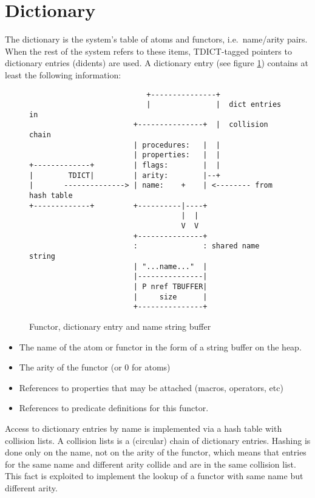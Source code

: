 \section{Dictionary}
\label{chapdictionary}
The dictionary  is the system's table of atoms  and functors, i.e.\
name/arity  pairs.  When the rest of the system refers to these items,
TDICT\index{TDICT}-tagged pointers to dictionary entries (didents\index{didents}) are used.
A dictionary entry (see figure \ref{figdictentry})
contains at least the following information:
\begin{figure}
\hfill
\begin{minipage}[t]{.9\textwidth}
\begin{tiny}
\begin{verbatim}
                           +---------------+
                           |               |  dict entries in
                        +---------------+  |  collision chain
                        | procedures:   |  |
                        | properties:   |  |
+-------------+         | flags:        |  |
|        TDICT|         | arity:        |--+
|       --------------> | name:    +    | <-------- from hash table
+-------------+         +----------|----+
                                   |  |
                                   V  V
                        +---------------+
                        :               : shared name string
                        | "...name..."  |
                        |---------------|
                        | P nref TBUFFER|
                        |     size      |
                        +---------------+
\end{verbatim}
\end{tiny}
\end{minipage}
\hfill
\caption{Functor, dictionary entry and name string buffer}
\label{figdictentry}
\end{figure}
\begin{itemize}
\item The name of the atom or functor in the form of a string buffer on the heap.
\item The arity of the functor (or 0 for atoms)
\item References to properties that may be attached (macros, operators, etc)
\item References to predicate definitions for this functor.
\end{itemize}
Access to dictionary entries by name is implemented via a hash table
with collision lists.  A collision lists is a (circular) chain of
dictionary entries. Hashing is done only on the name, not on the arity
of the functor, which means that entries for the same name and different
arity collide and are in the same collision list. This fact is exploited
to implement the lookup of a functor with same name but different arity.


